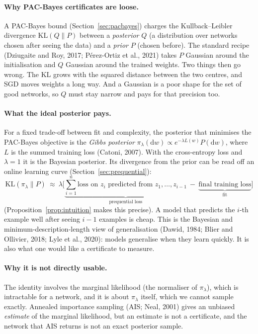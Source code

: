 \documentclass[11pt]{article}
\theoremstyle{definition}
\theoremstyle{remark}
\newcommand{\KL}{\mathrm{KL}}
\newcommand{\dd}{\mathrm{d}}
\begin{document}
\paragraph{Why PAC-Bayes certificates are loose.} A PAC-Bayes bound (Section~\ref{sec:pacbayes}) charges the
Kullback--Leibler divergence $\KL(Q\|P)$ between a \emph{posterior} $Q$ (a distribution over networks chosen after
seeing the data) and a \emph{prior} $P$ (chosen before). The standard recipe (Dziugaite and Roy, 2017; P\'erez-Ortiz et
al., 2021) takes $P$ Gaussian around the initialisation and $Q$ Gaussian around the trained weights. Two things then go
wrong. The KL grows with the squared distance between the two centres, and SGD moves weights a long way. And a Gaussian
is a poor shape for the set of good networks, so $Q$ must stay narrow and pays for that precision too.

\paragraph{What the ideal posterior pays.} For a fixed trade-off between fit and complexity, the posterior that
minimises the PAC-Bayes objective is the \emph{Gibbs posterior} $\pi_\lambda(\dd w)\propto e^{-\lambda L(w)}P(\dd w)$,
where $L$ is the summed training loss (Catoni, 2007). With the cross-entropy loss and $\lambda=1$ it is the Bayesian
posterior. Its divergence from the prior can be read off an online learning curve (Section~\ref{sec:prequential}):
\[
\KL(\pi_\lambda\|P)\ \approx\ \lambda\Big[\underbrace{\textstyle\sum_{i=1}^n \text{loss on $z_i$ predicted from $z_1,\dots,z_{i-1}$}}_{\text{prequential loss}}\ -\ \underbrace{\text{final training loss}}_{\text{fit}}\Big]
\]
(Proposition~\ref{prop:intuition} makes this precise). A model that predicts the $i$-th example well after seeing
$i-1$ examples is cheap. This is the Bayesian and
minimum-description-length view of generalisation (Dawid, 1984; Blier and Ollivier, 2018; Lyle et al., 2020): models
generalise when they learn quickly. It is also what one would like a certificate to measure.

\paragraph{Why it is not directly usable.} The identity involves the marginal likelihood (the normaliser of
$\pi_\lambda$), which is intractable for a network, and it is about $\pi_\lambda$ itself, which we cannot sample exactly.
Annealed importance sampling (AIS; Neal, 2001) gives an unbiased \emph{estimate} of the marginal likelihood, but an
estimate is not a certificate, and the network that AIS returns is not an exact posterior sample.
\end{document}
